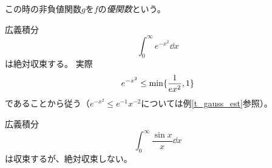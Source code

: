 \begin{remark}
この時の非負値関数$g$を$f$の\emph{優関数}という。
\end{remark}

\begin{example}
広義積分
$$
\int_0^\infty e^{-x^2}\dd{x}
$$
は絶対収束する。
実際
$$
e^{-x^2} \le \min\{ \frac{1}{e x^2}, 1 \}
$$
であることから従う（$e^{-x^2} \le e^{-1}x^{-2}$については例\ref{t_gauss_est}参照）。
\end{example}

\begin{example}
広義積分
$$
\int_0^\infty \frac{\sin x}{x}\dd{x}
$$
は収束するが、絶対収束しない。
\end{example}
